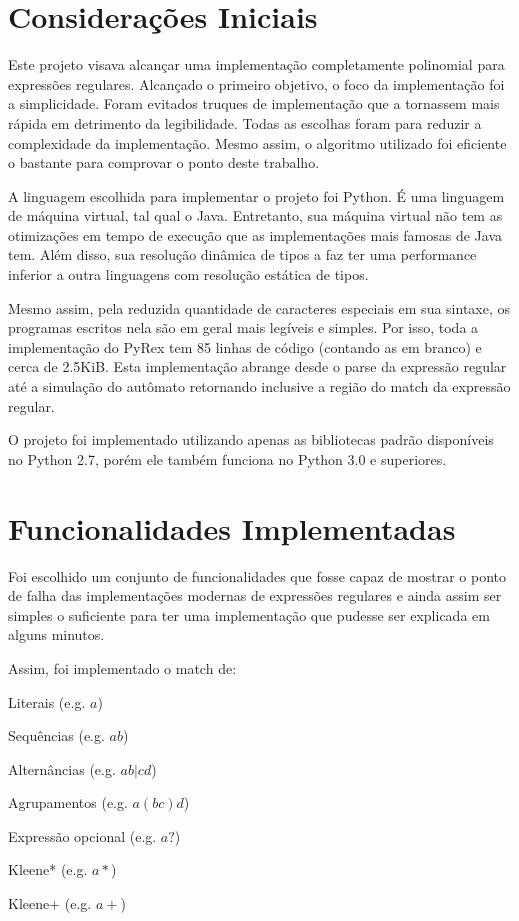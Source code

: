 \documentclass[a4paper,12pt,oneside,onecolumn]{uerj}
\begin{document}
\section{Considerações Iniciais}

Este projeto visava alcançar uma implementação completamente polinomial para expressões regulares. Alcançado o primeiro objetivo, o foco da implementação foi a simplicidade. Foram evitados truques de implementação que a tornassem mais rápida em detrimento da legibilidade. Todas as escolhas foram para reduzir a complexidade da implementação. Mesmo assim, o algoritmo utilizado foi eficiente o bastante para comprovar o ponto deste trabalho.

A linguagem escolhida para implementar o projeto foi Python. É uma linguagem de máquina virtual, tal qual o Java. Entretanto, sua máquina virtual não tem as otimizações em tempo de execução que as implementações mais famosas de Java tem. Além disso, sua resolução dinâmica de tipos a faz ter uma performance inferior a outra linguagens com resolução estática de tipos. 

Mesmo assim, pela reduzida quantidade de caracteres especiais em sua sintaxe, os programas escritos nela são em geral mais legíveis e simples. Por isso, toda a implementação do PyRex tem 85 linhas de código (contando as em branco) e cerca de 2.5KiB. Esta implementação abrange desde o parse da expressão regular até a simulação do autômato retornando inclusive a região do match da expressão regular.

O projeto foi implementado utilizando apenas as bibliotecas padrão disponíveis no Python 2.7, porém ele também funciona no Python 3.0 e superiores.

\section{Funcionalidades Implementadas}

Foi escolhido um conjunto de funcionalidades que fosse capaz de mostrar o ponto de falha das implementações modernas de expressões regulares e ainda assim ser simples o suficiente para ter uma implementação que pudesse ser explicada em alguns minutos.

Assim, foi implementado o match de:

\begin{lcircp}
    \item Literais (e.g. $a$)
    \item Sequências (e.g. $ab$)
    \item Alternâncias (e.g. $ab|cd$)
    \item Agrupamentos (e.g. $a(bc)d$)
    \item Expressão opcional (e.g. $a?$)
    \item Kleene* (e.g. $a*$)
    \item Kleene+ (e.g. $a+$)
\end{lcircp}
\end{document}
